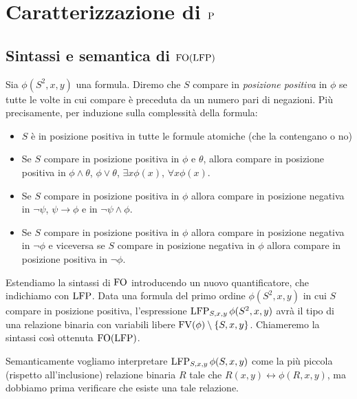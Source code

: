 \chapter{Caratterizzazione di $\P$}

\section{Sintassi e semantica di $\FO(\LFP)$}

\begin{definizione}
 Sia $\phi(S^2,x,y)$ una formula.
 Diremo che $S$ compare in \emph{posizione positiva} in $\phi$ se tutte le volte
 in cui compare è preceduta da un
 numero pari di negazioni. Più precisamente, per induzione sulla complessità
 della formula:
 \begin{itemize}
  \item $S$ è in posizione positiva in tutte le formule atomiche (che la contengano o no)
  \item Se $S$ compare in posizione positiva in $\phi$ e $\theta$, allora compare
  in posizione positiva in $\phi \land \theta$, $\phi \lor \theta$, $\exists x \phi(x)$,
  $\forall x \phi(x)$.
  \item Se $S$ compare in posizione positiva in $\phi$ allora compare in posizione
  negativa in $\lnot \psi$, $\psi \to \phi$ e in $\lnot \psi \land \phi$.
  \item Se $S$ compare in posizione positiva in $\phi$ allora compare in posizione
  negativa in $\lnot \phi$ e viceversa se $S$ compare in posizione negativa in $\phi$
  allora compare in posizione
  positiva in $\lnot \phi$.
 \end{itemize}
\end{definizione}


\begin{definizione}
 Estendiamo la sintassi di $\FO$ introducendo un nuovo quantificatore, che
 indichiamo con $\LFP$. Data una
 formula del primo ordine $\phi(S^2,x,y)$ in cui $S$ compare in posizione positiva,
 l'espressione $\LFP_{S,x,y} \phi(S^2,x,y)$ avrà il tipo di una relazione binaria
 con variabili
 libere $\FV(\phi) \setminus \{S,x,y\}$.
 Chiameremo la sintassi così ottenuta $\FO(\LFP)$.
\end{definizione}

Semanticamente vogliamo interpretare $\LFP_{S,x,y} \phi(S,x,y)$ come la più
piccola (rispetto all'inclusione) relazione binaria $R$ tale che $R(x,y) \leftrightarrow \phi(R,x,y)$, ma dobbiamo
prima verificare che esiste una tale relazione.

